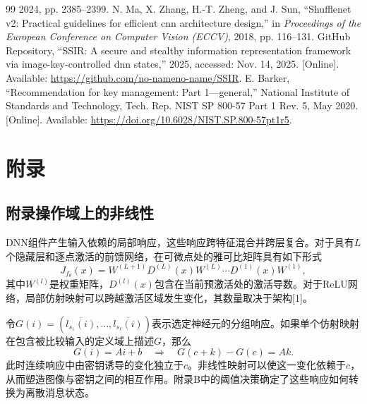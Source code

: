 \documentclass[UTF8,a4paper,zihao=-4,fontset=windows,openany]{ctexbook}
\begin{document}
\begin{thebibliography}{99}
2024, pp. 2385--2399.
N. Ma, X. Zhang, H.-T. Zheng, and J. Sun,
``Shufflenet v2: Practical guidelines for efficient cnn architecture design,''
in \emph{Proceedings of the European Conference on Computer Vision (ECCV)},
2018, pp. 116--131.
GitHub Repository,
``SSIR: A secure and stealthy information representation framework via image-key-controlled dnn states,''
2025, accessed: Nov. 14, 2025. [Online]. Available:
\url{https://github.com/no-nameno-name/SSIR}.
E. Barker,
``Recommendation for key management: Part 1---general,''
National Institute of Standards and Technology,
Tech. Rep. NIST SP 800-57 Part 1 Rev. 5, May 2020. [Online]. Available:
\url{https://doi.org/10.6028/NIST.SP.800-57pt1r5}.
\end{thebibliography}
\appendix
\chapter*{附录}

\newcommand{\appendixsection}[1]{%
  \section*{附录\quad #1}%
}

\appendixsection{操作域上的非线性}
DNN组件产生输入依赖的局部响应，这些响应跨特征混合并跨层复合。对于具有\(L\)个隐藏层和逐点激活的前馈网络，在可微点处的雅可比矩阵具有如下形式
\begin{equation}
J_{f_\theta}(x) = W^{(L+1)} D^{(L)}(x) W^{(L)} \cdots D^{(1)}(x) W^{(1)}, \tag{21}
\end{equation}
其中\(W^{(l)}\)是权重矩阵，\(D^{(l)}(x)\)包含在当前预激活处的激活导数。对于ReLU网络，局部仿射映射可以跨越激活区域发生变化，其数量取决于架构[1]。

令\(G(i) = (\overline{l_{s_1}(i)}, \ldots, \overline{l_{s_\ell}(i)})\)表示选定神经元的分组响应。如果单个仿射映射在包含被比较输入的定义域上描述\(G\)，那么
\begin{equation}
G(i) = Ai + b \quad \Longrightarrow \quad G(c + k) - G(c) = Ak. \tag{22}
\end{equation}
此时连续响应中由密钥诱导的变化独立于\(c\)。非线性映射可以使这一变化依赖于\(c\)，从而塑造图像与密钥之间的相互作用。附录B中的阈值决策确定了这些响应如何转换为离散消息状态。
\end{document}
